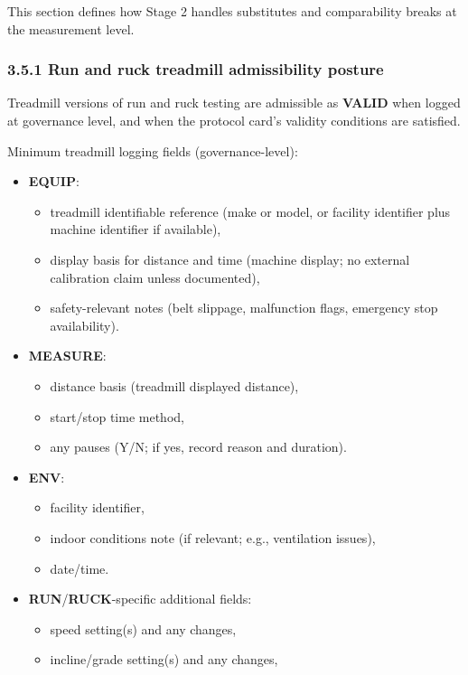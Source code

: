 \documentclass[10pt]{article}
\begin{document}
This section defines how Stage 2 handles substitutes and comparability breaks at the measurement level.

\subsubsection*{3.5.1 Run and ruck treadmill admissibility posture}

Treadmill versions of run and ruck testing are admissible as \textbf{VALID} when logged at governance level, and when the protocol card’s validity conditions are satisfied.

Minimum treadmill logging fields (governance-level):

\begin{itemize}
\item \textbf{EQUIP}:
  \begin{itemize}
  \item treadmill identifiable reference (make or model, or facility identifier plus machine identifier if available),
  \item display basis for distance and time (machine display; no external calibration claim unless documented),
  \item safety-relevant notes (belt slippage, malfunction flags, emergency stop availability).
  \end{itemize}
\item \textbf{MEASURE}:
  \begin{itemize}
  \item distance basis (treadmill displayed distance),
  \item start/stop time method,
  \item any pauses (Y/N; if yes, record reason and duration).
  \end{itemize}
\item \textbf{ENV}:
  \begin{itemize}
  \item facility identifier,
  \item indoor conditions note (if relevant; e.g., ventilation issues),
  \item date/time.
  \end{itemize}
\item \textbf{RUN}/\textbf{RUCK}-specific additional fields:
  \begin{itemize}
  \item speed setting(s) and any changes,
  \item incline/grade setting(s) and any changes,

\end{itemize}
\end{itemize}
\end{document}
